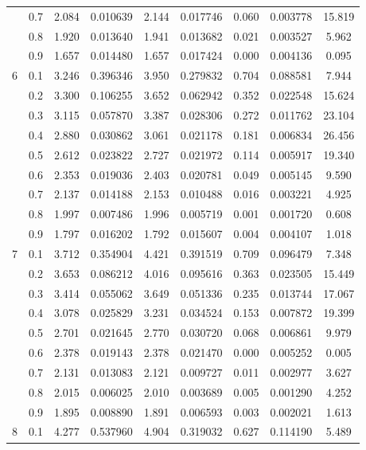 \begin{longtable}{ | c | c || c | c | c | c | c | c | c | }
 & 0.7 & 2.084 & 0.010639 & 2.144 & 0.017746 & 0.060 & 0.003778 & 15.819 \\
 & 0.8 & 1.920 & 0.013640 & 1.941 & 0.013682 & 0.021 & 0.003527 & 5.962 \\
 & 0.9 & 1.657 & 0.014480 & 1.657 & 0.017424 & 0.000 & 0.004136 & 0.095 \\
 \hline
\multirow{9}{*}{6} & 0.1 & 3.246 & 0.396346 & 3.950 & 0.279832 & 0.704 & 0.088581 & 7.944 \\
 & 0.2 & 3.300 & 0.106255 & 3.652 & 0.062942 & 0.352 & 0.022548 & 15.624 \\
 & 0.3 & 3.115 & 0.057870 & 3.387 & 0.028306 & 0.272 & 0.011762 & 23.104 \\
 & 0.4 & 2.880 & 0.030862 & 3.061 & 0.021178 & 0.181 & 0.006834 & 26.456 \\
 & 0.5 & 2.612 & 0.023822 & 2.727 & 0.021972 & 0.114 & 0.005917 & 19.340 \\
 & 0.6 & 2.353 & 0.019036 & 2.403 & 0.020781 & 0.049 & 0.005145 & 9.590 \\
 & 0.7 & 2.137 & 0.014188 & 2.153 & 0.010488 & 0.016 & 0.003221 & 4.925 \\
 & 0.8 & 1.997 & 0.007486 & 1.996 & 0.005719 & 0.001 & 0.001720 & 0.608 \\
 & 0.9 & 1.797 & 0.016202 & 1.792 & 0.015607 & 0.004 & 0.004107 & 1.018 \\
 \hline
\multirow{9}{*}{7} & 0.1 & 3.712 & 0.354904 & 4.421 & 0.391519 & 0.709 & 0.096479 & 7.348 \\
 & 0.2 & 3.653 & 0.086212 & 4.016 & 0.095616 & 0.363 & 0.023505 & 15.449 \\
 & 0.3 & 3.414 & 0.055062 & 3.649 & 0.051336 & 0.235 & 0.013744 & 17.067 \\
 & 0.4 & 3.078 & 0.025829 & 3.231 & 0.034524 & 0.153 & 0.007872 & 19.399 \\
 & 0.5 & 2.701 & 0.021645 & 2.770 & 0.030720 & 0.068 & 0.006861 & 9.979 \\
 & 0.6 & 2.378 & 0.019143 & 2.378 & 0.021470 & 0.000 & 0.005252 & 0.005 \\
 & 0.7 & 2.131 & 0.013083 & 2.121 & 0.009727 & 0.011 & 0.002977 & 3.627 \\
 & 0.8 & 2.015 & 0.006025 & 2.010 & 0.003689 & 0.005 & 0.001290 & 4.252 \\
 & 0.9 & 1.895 & 0.008890 & 1.891 & 0.006593 & 0.003 & 0.002021 & 1.613 \\
 \hline
\multirow{9}{*}{8} & 0.1 & 4.277 & 0.537960 & 4.904 & 0.319032 & 0.627 & 0.114190 & 5.489 \\

\end{longtable}
